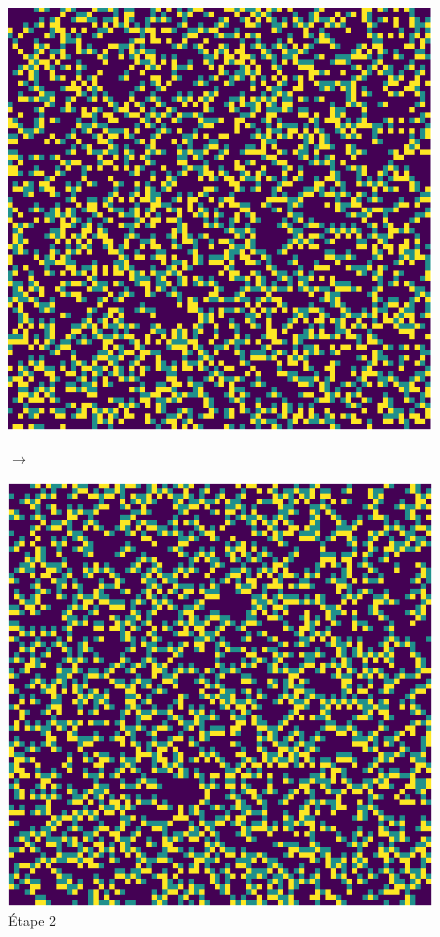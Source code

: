 \documentclass[12pt, a4paper]{article}
\begin{document}
\begin{center}
\begin{figure}[!h]
\begin{minipage}{.3\linewidth}
                    \includegraphics[scale=0.2]{img/step2.png}
                    \caption{Étape 2}
                \end{minipage}
                $\rightarrow$
                \begin{minipage}{.3\linewidth}
                    \centering
                    \includegraphics[scale=0.2]{img/step3.png}

\end{minipage}
\end{figure}
\end{center}
\end{document}
